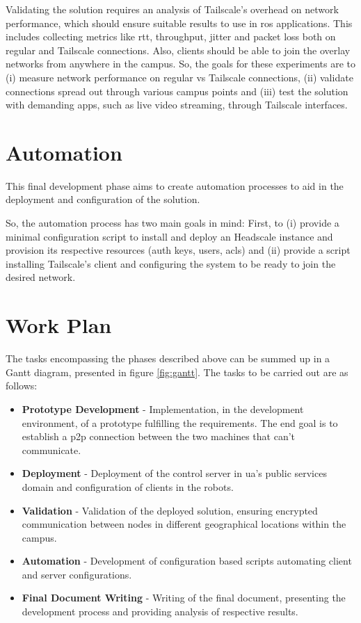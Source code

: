 \documentclass[11pt,twoside,a4paper]{report}
\begin{document}
Validating the solution requires an analysis of Tailscale's overhead on  network performance, which should ensure suitable results to use in \ac{ros} applications. This includes collecting metrics like \ac{rtt}, throughput, jitter and packet loss both on regular and Tailscale connections. Also, clients should be able to join the overlay networks from anywhere in the campus. So, the goals for these experiments are to (i) measure network performance on regular vs Tailscale connections, (ii) validate connections spread out through various campus points and (iii) test the solution with demanding apps, such as live video streaming, through Tailscale interfaces.

\section{Automation}
\label{sec:automethod}

This final development phase aims to create automation processes to aid in the deployment and configuration of the solution.

So, the automation process has two main goals in mind: First, to (i) provide a minimal configuration script to install and deploy an Headscale instance and provision its respective resources (auth keys, users, \acp{acl}) and (ii) provide a script installing Tailscale's client and configuring the system to be ready to join the desired network.

\section{Work Plan}

The tasks encompassing the phases described above can be summed up in a Gantt diagram, presented in figure \ref{fig:gantt}. The tasks to be carried out are as follows:

\begin{itemize}
  \item \textbf{Prototype Development} - Implementation, in the development environment, of a prototype fulfilling the requirements. The end goal is to establish a \ac{p2p} connection between the two machines that can't communicate.
  \item \textbf{Deployment} - Deployment of the control server in \ac{ua}'s public services domain and configuration of clients in the robots.
  \item \textbf{Validation} - Validation of the deployed solution, ensuring encrypted communication between nodes in different geographical locations within the campus.
  \item \textbf{Automation} - Development of configuration based scripts automating client and server configurations.
  \item \textbf{Final Document Writing} - Writing of the final document, presenting the development process and providing analysis of respective results.
\end{itemize}
\end{document}
